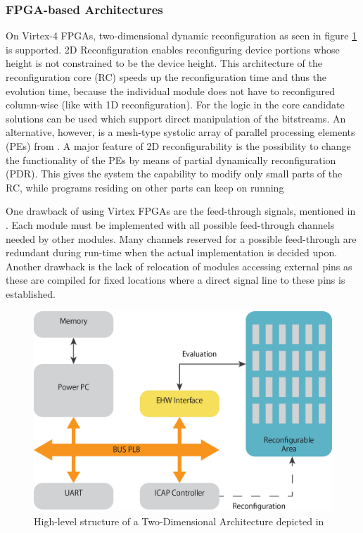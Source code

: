 \subsubsection{FPGA-based Architectures}
\label{sec:fpga}
On Virtex-4 FPGAs, two-dimensional dynamic reconfiguration as seen in figure \ref{fig:2d} is supported. 2D Reconfiguration enables reconfiguring device portions whose height is not constrained to be the device height. This architecture of the reconfiguration core (RC) speeds up the reconfiguration time and thus the evolution time, because the individual module does not have to reconfigured column-wise (like with 1D reconfiguration). For the logic in the core candidate solutions can be used which support direct manipulation of the bitstreams. An alternative, however, is a mesh-type systolic array of parallel processing elements (PEs) from \cite{PDR}. A major feature of 2D reconfigurability is the possibility to change the functionality of the PEs by means of partial dynamically reconfiguration (PDR). This gives the system the capability to modify only small parts of the RC, while programs residing on other parts can keep on running 

One drawback of using Virtex FPGAs are the feed-through signals, mentioned in \cite{erlangen}. Each module must be implemented with all possible feed-through channels needed by other modules. Many channels reserved for a possible feed-through are redundant during run-time when the actual implementation is decided upon. Another drawback is the lack of relocation of modules accessing external pins as these are compiled for fixed locations where a direct signal line to these pins is established. 
	
\begin{figure}[htb]%
\includegraphics[width=\columnwidth]{Pictures/2D_architecture.png}%
\caption{High-level structure of a Two-Dimensional Architecture depicted in \cite{virtex4}}%
\label{fig:2d}%
\end{figure}

